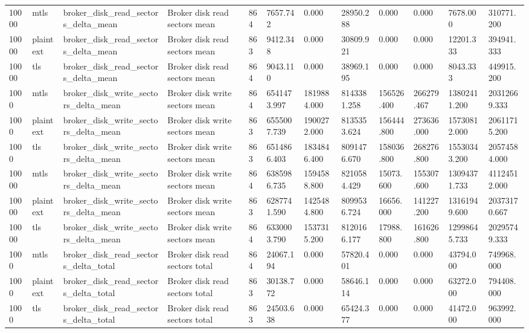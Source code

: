 \begin{longtable}{llllllllllll}
10000 & mtls & broker\_disk\_read\_sectors\_delta\_mean & Broker disk read sectors mean & 864 & 7657.742 & 0.000 & 28950.288 & 0.000 & 0.000 & 7678.000 & 310771.200 \\
10000 & plaintext & broker\_disk\_read\_sectors\_delta\_mean & Broker disk read sectors mean & 863 & 9412.348 & 0.000 & 30809.921 & 0.000 & 0.000 & 12201.333 & 394941.333 \\
10000 & tls & broker\_disk\_read\_sectors\_delta\_mean & Broker disk read sectors mean & 864 & 9043.110 & 0.000 & 38969.195 & 0.000 & 0.000 & 8043.333 & 449915.200 \\
1000 & mtls & broker\_disk\_write\_sectors\_delta\_mean & Broker disk write sectors mean & 864 & 6541473.997 & 1819884.000 & 8143381.258 & 156526.400 & 266279.467 & 13802411.200 & 20312669.333 \\
1000 & plaintext & broker\_disk\_write\_sectors\_delta\_mean & Broker disk write sectors mean & 863 & 6555007.739 & 1900272.000 & 8135353.624 & 156444.800 & 273636.000 & 15730812.000 & 20611715.200 \\
1000 & tls & broker\_disk\_write\_sectors\_delta\_mean & Broker disk write sectors mean & 863 & 6514866.403 & 1834846.400 & 8091476.670 & 158036.800 & 268276.800 & 15530343.200 & 20574584.000 \\
10000 & mtls & broker\_disk\_write\_sectors\_delta\_mean & Broker disk write sectors mean & 864 & 6385986.735 & 1594588.800 & 8210584.429 & 15073.600 & 155307.600 & 13094371.733 & 41124512.000 \\
10000 & plaintext & broker\_disk\_write\_sectors\_delta\_mean & Broker disk write sectors mean & 863 & 6287741.590 & 1425484.800 & 8099536.724 & 16656.000 & 141227.200 & 13161949.600 & 20373170.667 \\
10000 & tls & broker\_disk\_write\_sectors\_delta\_mean & Broker disk write sectors mean & 864 & 6330003.790 & 1537315.200 & 8120166.177 & 17988.800 & 161626.800 & 12998645.733 & 20295749.333 \\
1000 & mtls & broker\_disk\_read\_sectors\_delta\_total & Broker disk read sectors total & 864 & 24067.194 & 0.000 & 57820.401 & 0.000 & 0.000 & 43794.000 & 749968.000 \\
1000 & plaintext & broker\_disk\_read\_sectors\_delta\_total & Broker disk read sectors total & 863 & 30138.772 & 0.000 & 58646.114 & 0.000 & 0.000 & 63272.000 & 794408.000 \\
1000 & tls & broker\_disk\_read\_sectors\_delta\_total & Broker disk read sectors total & 863 & 24503.638 & 0.000 & 65424.377 & 0.000 & 0.000 & 41472.000 & 963992.000 \\

\end{longtable}
